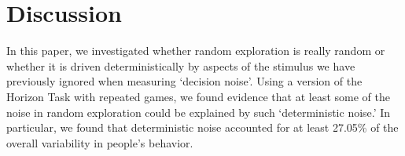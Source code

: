 \documentclass[12pt]{article}
\begin{document}
	
	
	
	\section*{Discussion}
	

	In this paper, we investigated whether random exploration is really random or whether it is driven deterministically by aspects of the stimulus we have previously ignored when measuring `decision noise'.  Using a version of the Horizon Task with repeated games, we found evidence that at least some of the noise in random exploration could be explained by such `deterministic noise.' In particular, we found that deterministic noise accounted for at least 27.05\% of the overall variability in people's behavior. %
		
\end{document}
